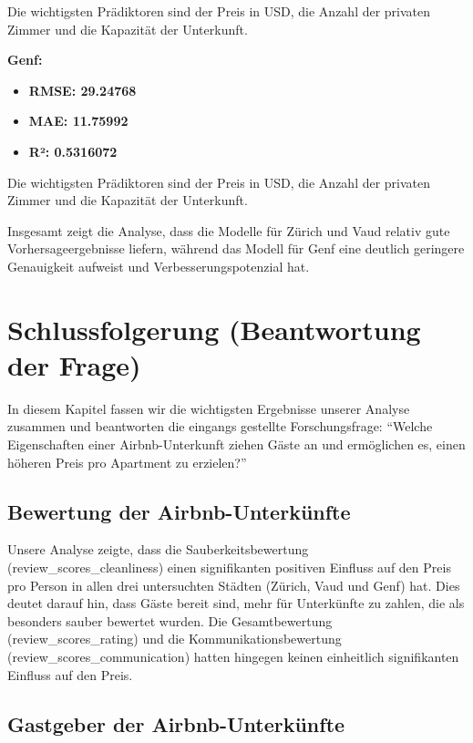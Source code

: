 \documentclass[
  journal,
]{IEEEtran}%
\begin{document}
Die wichtigsten Prädiktoren sind der Preis in USD, die Anzahl der
privaten Zimmer und die Kapazität der Unterkunft.

\textbf{Genf:}

\begin{itemize}
\item
  \textbf{RMSE: 29.24768}
\item
  \textbf{MAE: 11.75992}
\item
  \textbf{R²: 0.5316072}
\end{itemize}

Die wichtigsten Prädiktoren sind der Preis in USD, die Anzahl der
privaten Zimmer und die Kapazität der Unterkunft.

Insgesamt zeigt die Analyse, dass die Modelle für Zürich und Vaud
relativ gute Vorhersageergebnisse liefern, während das Modell für Genf
eine deutlich geringere Genauigkeit aufweist und Verbesserungspotenzial
hat.

\hypertarget{schlussfolgerung-beantwortung-der-frage}{%
\section{Schlussfolgerung (Beantwortung der
Frage)}\label{schlussfolgerung-beantwortung-der-frage}}

In diesem Kapitel fassen wir die wichtigsten Ergebnisse unserer Analyse
zusammen und beantworten die eingangs gestellte Forschungsfrage:
``Welche Eigenschaften einer Airbnb-Unterkunft ziehen Gäste an und
ermöglichen es, einen höheren Preis pro Apartment zu erzielen?''

\hypertarget{bewertung-der-airbnb-unterkuxfcnfte-1}{%
\subsection{Bewertung der
Airbnb-Unterkünfte}\label{bewertung-der-airbnb-unterkuxfcnfte-1}}

Unsere Analyse zeigte, dass die Sauberkeitsbewertung
(review\_scores\_cleanliness) einen signifikanten positiven Einfluss auf
den Preis pro Person in allen drei untersuchten Städten (Zürich, Vaud
und Genf) hat. Dies deutet darauf hin, dass Gäste bereit sind, mehr für
Unterkünfte zu zahlen, die als besonders sauber bewertet wurden. Die
Gesamtbewertung (review\_scores\_rating) und die Kommunikationsbewertung
(review\_scores\_communication) hatten hingegen keinen einheitlich
signifikanten Einfluss auf den Preis.

\hypertarget{gastgeber-der-airbnb-unterkuxfcnfte}{%
\subsection{Gastgeber der
Airbnb-Unterkünfte}\label{gastgeber-der-airbnb-unterkuxfcnfte}}
\end{document}
